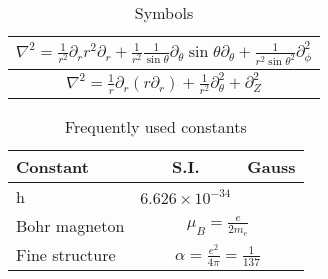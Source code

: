 \begin{table}
    \caption{Symbols}
    \label{tab:symbols}
    \begin{tabular}{c}
    \hline
    $\nabla^2 = \frac{1}{r^2}\partial_r r^2 \partial_r +
    \frac{1}{r^2}\frac{1}{\sin\theta} \partial_{\theta}\sin\theta\partial_{\theta} +
    \frac{1}{r^2\sin\theta^2}\partial^2_{\phi}$	\\
    \hline
    $\nabla^2 = \frac{1}{r}\partial_r (r\partial_r) +
    \frac{1}{r^2}\partial^2_{\theta} + \partial^2_Z$ \\
    \hline
    \end{tabular}
\end{table}
\begin{table}
    \caption{Frequently used constants}
    \label{tab:constants}
    \begin{center}
	\begin{tabular}{l|cc}
	    \hline
	    Constant    & S.I.  & Gauss \\
	    \hline
	    h	& $6.626\times10^{-34}$	&   \\
	    \hline
	    Bohr magneton   & \multicolumn{2}{c}{$\mu_B=\frac{e}{2m_e}$} \\
	    Fine structure  & \multicolumn{2}{c}{$\alpha=\frac{e^2}{4\pi}=\frac{1}{137}$}	\\
	    \hline
	\end{tabular}
    \end{center}
\end{table}
